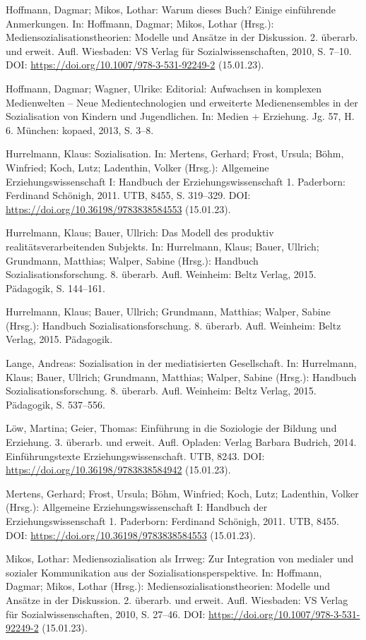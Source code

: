 \documentclass[a4paper,
fontsize=11pt,
oneside,
numbers=noperiodatend,
parskip=half-,
bibliography=totoc,
final
]{scrartcl}
\begin{document}
Hoffmann, Dagmar; Mikos, Lothar: Warum dieses Buch? Einige einführende
Anmerkungen. In: Hoffmann, Dagmar; Mikos, Lothar (Hrsg.):
Mediensozialisationstheorien: Modelle und Ansätze in der Diskussion. 2.
überarb. und erweit. Aufl. Wiesbaden: VS Verlag für
Sozialwissenschaften, 2010, S. 7--10. DOI:
\url{https://doi.org/10.1007/978-3-531-92249-2} (15.01.23).

Hoffmann, Dagmar; Wagner, Ulrike: Editorial: Aufwachsen in komplexen
Medienwelten -- Neue Medientechnologien und erweiterte Medienensembles
in der Sozialisation von Kindern und Jugendlichen. In: Medien +
Erziehung. Jg. 57, H. 6. München: kopaed, 2013, S. 3--8.

Hurrelmann, Klaus: Sozialisation. In: Mertens, Gerhard; Frost, Ursula;
Böhm, Winfried; Koch, Lutz; Ladenthin, Volker (Hrsg.): Allgemeine
Erziehungswissenschaft I: Handbuch der Erziehungswissenschaft 1.
Paderborn: Ferdinand Schönigh, 2011. UTB, 8455, S. 319--329. DOI:
\url{https://doi.org/10.36198/9783838584553} (15.01.23).

Hurrelmann, Klaus; Bauer, Ullrich: Das Modell des produktiv
realitätsverarbeitenden Subjekts. In: Hurrelmann, Klaus; Bauer, Ullrich;
Grundmann, Matthias; Walper, Sabine (Hrsg.): Handbuch
Sozialisationsforschung. 8. überarb. Aufl. Weinheim: Beltz Verlag, 2015.
Pädagogik, S. 144--161.

Hurrelmann, Klaus; Bauer, Ullrich; Grundmann, Matthias; Walper, Sabine
(Hrsg.): Handbuch Sozialisationsforschung. 8. überarb. Aufl. Weinheim:
Beltz Verlag, 2015. Pädagogik.

Lange, Andreas: Sozialisation in der mediatisierten Gesellschaft. In:
Hurrelmann, Klaus; Bauer, Ullrich; Grundmann, Matthias; Walper, Sabine
(Hrsg.): Handbuch Sozialisationsforschung. 8. überarb. Aufl. Weinheim:
Beltz Verlag, 2015. Pädagogik, S. 537--556.

Löw, Martina; Geier, Thomas: Einführung in die Soziologie der Bildung
und Erziehung. 3. überarb. und erweit. Aufl. Opladen: Verlag Barbara
Budrich, 2014. Einführungstexte Erziehungswissenschaft. UTB, 8243. DOI:
\url{https://doi.org/10.36198/9783838584942} (15.01.23).

Mertens, Gerhard; Frost, Ursula; Böhm, Winfried; Koch, Lutz; Ladenthin,
Volker (Hrsg.): Allgemeine Erziehungswissenschaft I: Handbuch der
Erziehungswissenschaft 1. Paderborn: Ferdinand Schönigh, 2011. UTB,
8455. DOI: \url{https://doi.org/10.36198/9783838584553} (15.01.23).

Mikos, Lothar: Mediensozialisation als Irrweg: Zur Integration von
medialer und sozialer Kommunikation aus der Sozialisationsperspektive.
In: Hoffmann, Dagmar; Mikos, Lothar (Hrsg.):
Mediensozialisationstheorien: Modelle und Ansätze in der Diskussion. 2.
überarb. und erweit. Aufl. Wiesbaden: VS Verlag für
Sozialwissenschaften, 2010, S. 27--46. DOI:
\url{https://doi.org/10.1007/978-3-531-92249-2} (15.01.23).
\end{document}
